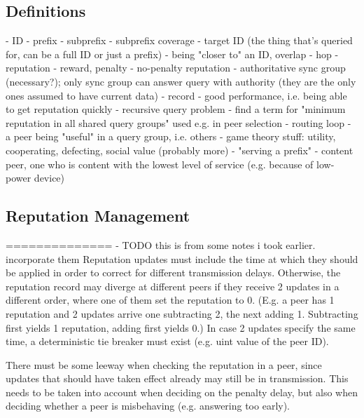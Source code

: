 \subsection{Definitions}
- ID
- prefix
- subprefix
- subprefix coverage
- target ID (the thing that's queried for, can be a full ID or just a prefix)
- being "closer to" an ID, overlap
- hop
- reputation
- reward, penalty
- no-penalty reputation
- authoritative sync group (necessary?); only sync group can answer query with
  authority (they are the only ones assumed to have current data)
- record
- good performance, i.e. being able to get reputation quickly
- recursive query problem
- find a term for "minimum reputation in all shared query groups" used e.g. in
  peer selection
- routing loop
- a peer being "useful" in a query group, i.e. others
- game theory stuff: utility, cooperating, defecting, social value (probably
  more)
- "serving a prefix"
- content peer, one who is content with the lowest level of service (e.g.
  because of low-power device)
\subsection{Reputation Management}
==============
- TODO this is from some notes i took earlier. incorporate them
Reputation updates must include the time at which they should be applied in
order to correct for different transmission delays. Otherwise, the reputation
record may diverge at different peers if they receive 2 updates in a different
order, where one of them set the reputation to 0. (E.g. a peer has 1 reputation
and 2 updates arrive one subtracting 2, the next adding 1. Subtracting first
yields 1 reputation, adding first yields 0.) In case 2 updates specify the same
time, a deterministic tie breaker must exist (e.g. uint value of the peer ID).

There must be some leeway when checking the reputation in a peer, since updates
that should have taken effect already may still be in transmission. This needs
to be taken into account when deciding on the penalty delay, but also when
deciding whether a peer is misbehaving (e.g. answering too early).

